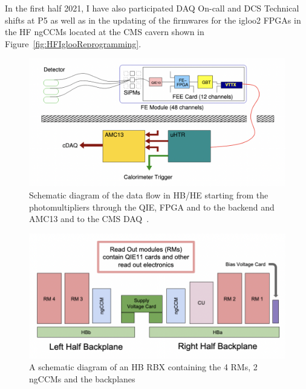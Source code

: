 In the first half 2021, I have also participated DAQ On-call and DCS Technical shifts at P5 as well as in the updating of the firmwares for the igloo2 FPGAs in the HF ngCCMs located at the CMS cavern shown in Figure~\ref{fig:HFIglooReprogramming}. 

\begin{figure}[tbp!]
\label{fig:DataFlowHCAL}
\begin{center}
\includegraphics[scale=0.6]{fig/CalorimeterTrigger.png}
\end{center}
\caption{ Schematic diagram of the data flow in HB/HE starting from the photomultipliers through the QIE, FPGA and to the backend and AMC13 and to the CMS DAQ~\cite{Cooper:2016kef}.
}
\end{figure}

\begin{figure}[!htb]
	\centering
	\includegraphics[scale=0.7]{fig/RMs.png}
	\caption{A schematic diagram of an HB RBX containing the 4 RMs, 2 ngCCMs and the backplanes~\cite{Cummings_phdThesis}}
	\label{fig:ReadOutModules}
\end{figure}

